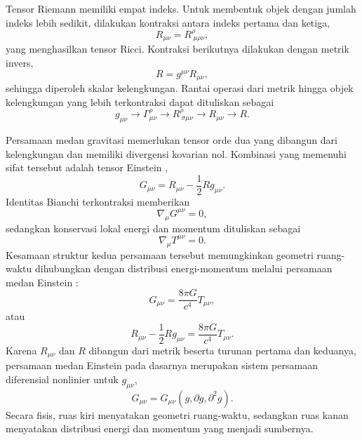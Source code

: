 Tensor Riemann memiliki empat indeks. Untuk membentuk objek dengan jumlah
indeks lebih sedikit, dilakukan kontraksi antara indeks pertama dan ketiga,
\begin{equation}
    R_{\mu\nu}=R^\rho_{\ \mu\rho\nu},
    \label{eq:ricci}
\end{equation}
yang menghasilkan tensor Ricci. Kontraksi berikutnya dilakukan dengan
metrik invers,
\begin{equation}
    R=g^{\mu\nu}R_{\mu\nu},
    \label{eq:ricci-scalar}
\end{equation}
sehingga diperoleh skalar kelengkungan. Rantai operasi dari metrik hingga
objek kelengkungan yang lebih terkontraksi dapat dituliskan sebagai
\begin{equation}
    g_{\mu\nu}
    \longrightarrow
    \Gamma^\rho_{\mu\nu}
    \longrightarrow
    R^\rho_{\ \sigma\mu\nu}
    \longrightarrow
    R_{\mu\nu}
    \longrightarrow
    R.
    \label{eq:curvature-chain}
\end{equation}

Persamaan medan gravitasi memerlukan tensor orde dua yang dibangun dari
kelengkungan dan memiliki divergensi kovarian nol. Kombinasi yang memenuhi
sifat tersebut adalah tensor Einstein \parencite{Misner1973Gravitation,Carroll2004SpacetimeGeometry},
\begin{equation}
    G_{\mu\nu}
    =R_{\mu\nu}-\frac{1}{2}Rg_{\mu\nu}.
    \label{eq:einstein-tensor}
\end{equation}
Identitas Bianchi terkontraksi memberikan
\begin{equation}
    \nabla_\mu G^{\mu\nu}=0,
    \label{eq:contracted-bianchi}
\end{equation}
sedangkan konservasi lokal energi dan momentum dituliskan sebagai
\begin{equation}
    \nabla_\mu T^{\mu\nu}=0.
    \label{eq:stress-energy-conservation}
\end{equation}
Kesamaan struktur kedua persamaan tersebut memungkinkan geometri
ruang-waktu dihubungkan dengan distribusi energi-momentum melalui persamaan
medan Einstein \parencite{Einstein1916GR,Schutz2009FirstCourse}:
\begin{equation}
    G_{\mu\nu}
    =\frac{8\pi G}{c^4}T_{\mu\nu},
    \label{eq:efe}
\end{equation}
atau
\begin{equation}
    R_{\mu\nu}-\frac{1}{2}Rg_{\mu\nu}
    =\frac{8\pi G}{c^4}T_{\mu\nu}.
\end{equation}
Karena $R_{\mu\nu}$ dan $R$ dibangun dari metrik beserta turunan pertama
dan keduanya, persamaan medan Einstein pada dasarnya merupakan sistem
persamaan diferensial nonlinier untuk $g_{\mu\nu}$,
\begin{equation}
    G_{\mu\nu}=G_{\mu\nu}\!\left(g,\partial g,\partial^2g\right).
    \label{eq:efe-metric-dependence}
\end{equation}
Secara fisis, ruas kiri menyatakan geometri ruang-waktu, sedangkan ruas
kanan menyatakan distribusi energi dan momentum yang menjadi sumbernya.

